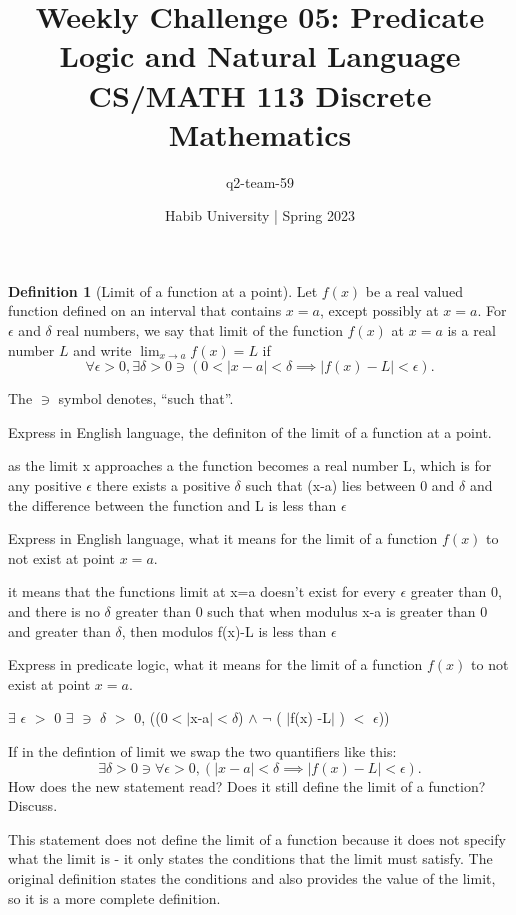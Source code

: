 \documentclass[a4paper]{exam}
\title{Weekly Challenge 05: Predicate Logic and Natural Language\\CS/MATH 113 Discrete Mathematics}
\author{q2-team-59}  %
\date{Habib University | Spring 2023}
\theoremstyle{definition}
\newtheorem{definition}{Definition}
\begin{document}
\maketitle

\begin{questions}

  \begin{definition}[Limit of a function at a point]
    Let $f(x)$ be a real valued function defined on an interval that contains $x=a$, except possibly at $x=a$. For $\epsilon$ and $\delta$ real numbers, we say that limit of the function $f(x)$ at $x=a$ is a real number $L$ and write $\lim_{x \to a} f(x)=L$ if 
    \[
      \forall \epsilon>0, \exists \delta>0 \ni (0<|x-a|<\delta \implies |f(x)-L|<\epsilon).
    \]
  \end{definition}
  The $\ni$ symbol denotes, ``such that''.
  \begin{parts}
  \item Express in English language, the definiton of the limit of a function at a point.
    \begin{solution}
      as the limit x approaches a the function becomes a real number L, which is for any positive $\epsilon$ there exists a positive $\delta$ such that (x-a) lies between 0 and $\delta$ and the difference between the function and L is less than $\epsilon$
    \end{solution}
  \item Express in English language, what it means for the limit of a function $f(x)$ to not exist at point $x=a$.
    \begin{solution}
      it means that the functions limit at x=a doesn't exist for every $\epsilon$ greater than 0, and there is no $\delta$ greater than 0 such that when modulus x-a is greater than 0 and greater than $\delta$, then modulos f(x)-L is less than $\epsilon$
    \end{solution}
  \item Express in predicate logic, what it means for the limit of a function $f(x)$ to not exist at point $x=a$.
    \begin{solution}
      
      $\exists$ $\epsilon$ $>$ 0 $\exists$ $\ni$ $\delta$ $>$ 0, ((0$<$$|$x-a$|$$<$$\delta$) $\land$ $\neg$ ( $|$f(x) -L$|$ ) $<$ $\epsilon$))
    \end{solution}
  \item If in the defintion of limit we swap the two quantifiers like this:
    \[
      \exists \delta>0 \ni \forall \epsilon>0, (|x-a|<\delta \implies |f(x)-L|<\epsilon).
    \]
    How does the new statement read? Does it still define the limit of a function? Discuss.
    \begin{solution}
      This statement does not define the limit of a function because it does not specify what the limit is - it only states the conditions that the limit must satisfy. The original definition states the conditions and also provides the value of the limit, so it is a more complete definition.
    \end{solution}
  \end{parts}
\end{questions}
\end{document}
